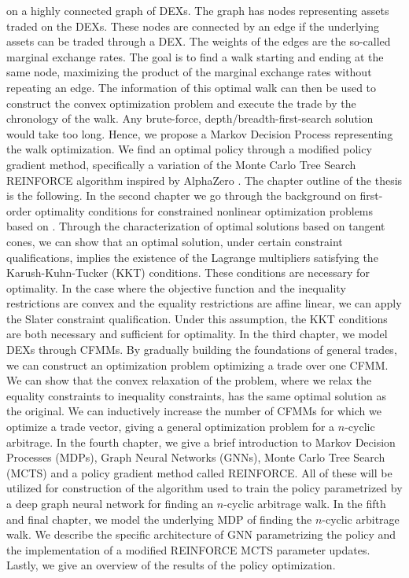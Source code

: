 on a highly connected graph of DEXs. The graph has nodes representing assets
traded on the DEXs. These nodes are connected by an edge if the underlying
assets can be traded through a DEX. The weights of the edges are
the so-called marginal exchange rates. The goal is to find a walk starting
and ending at the same node, maximizing the product of the marginal exchange
rates without repeating an edge. The information of this optimal walk can
then be used to construct the convex optimization problem and execute the
trade by the chronology of the walk. Any brute-force,
depth/breadth-first-search solution would take too long. Hence, we propose a
Markov Decision Process representing the walk optimization. We find an
optimal policy through a modified policy gradient method, specifically a
variation of the Monte Carlo Tree Search REINFORCE \cite{sutton_barto}
algorithm inspired by AlphaZero \cite{alphazero}.
\newline
The chapter outline of the thesis is the following.
\newline
In the second chapter we go through the background on first-order optimality
conditions for constrained nonlinear optimization problems based on
\cite{bot_optimization}. Through the characterization of optimal solutions
based on tangent cones, we can show that an optimal solution, under certain
constraint qualifications, implies the existence of the Lagrange multipliers
satisfying the Karush-Kuhn-Tucker (KKT) conditions. These conditions are
necessary for optimality. In the case where the objective function and the
inequality restrictions are convex and the equality restrictions are affine linear,
we can apply the Slater constraint qualification. Under this assumption, the
KKT conditions are both necessary and sufficient for optimality.
\newline
In the third chapter, we model DEXs through CFMMs. By gradually building the
foundations of general trades, we can construct an optimization problem
optimizing a trade over one CFMM. We can show that the convex relaxation of
the problem, where we relax the equality constraints to inequality
constraints, has the same optimal solution as the original. We can
inductively increase the number of CFMMs for which we optimize a trade
vector, giving a general optimization problem for a $n$-cyclic arbitrage.
\newline
In the fourth chapter, we give a brief introduction to Markov Decision
Processes (MDPs), Graph Neural Networks (GNNs), Monte Carlo Tree Search
(MCTS) and a policy gradient method called REINFORCE. All of these
will be utilized for construction of the algorithm used to train the policy
parametrized by a deep graph neural network for finding an $n$-cyclic
arbitrage walk.
\newline
In the fifth and final chapter, we model the underlying MDP of finding the
$n$-cyclic arbitrage walk. We describe the specific architecture of GNN
parametrizing the policy and the implementation of a modified REINFORCE MCTS
parameter updates. Lastly, we give an overview of the results of the policy
optimization.
